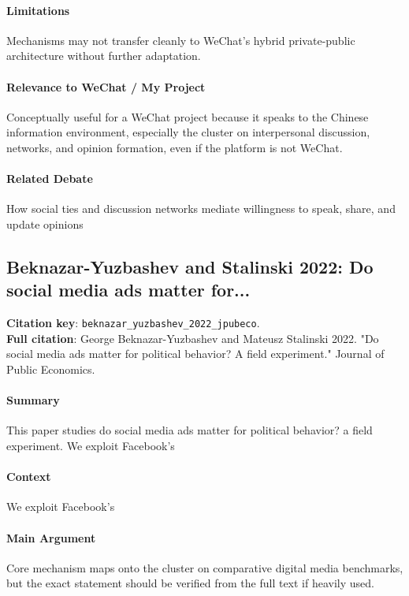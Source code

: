 \documentclass[12pt]{article}
\begin{document}
\paragraph{Limitations} Mechanisms may not transfer cleanly to WeChat's hybrid private-public architecture without further adaptation.

\paragraph{Relevance to WeChat / My Project} Conceptually useful for a WeChat project because it speaks to the Chinese information environment, especially the cluster on interpersonal discussion, networks, and opinion formation, even if the platform is not WeChat.

\paragraph{Related Debate} How social ties and discussion networks mediate willingness to speak, share, and update opinions


\subsection{Beknazar-Yuzbashev and Stalinski 2022: Do social media ads matter for...}
\textbf{Citation key}: \texttt{beknazar\_yuzbashev\_2022\_jpubeco}.\\
\textbf{Full citation}: George Beknazar-Yuzbashev and Mateusz Stalinski 2022. "Do social media ads matter for political behavior? A field experiment." Journal of Public Economics.

\paragraph{Summary} This paper studies do social media ads matter for political behavior? a field experiment. We exploit Facebook's

\paragraph{Context} We exploit Facebook's

\paragraph{Main Argument} Core mechanism maps onto the cluster on comparative digital media benchmarks, but the exact statement should be verified from the full text if heavily used.
\end{document}
